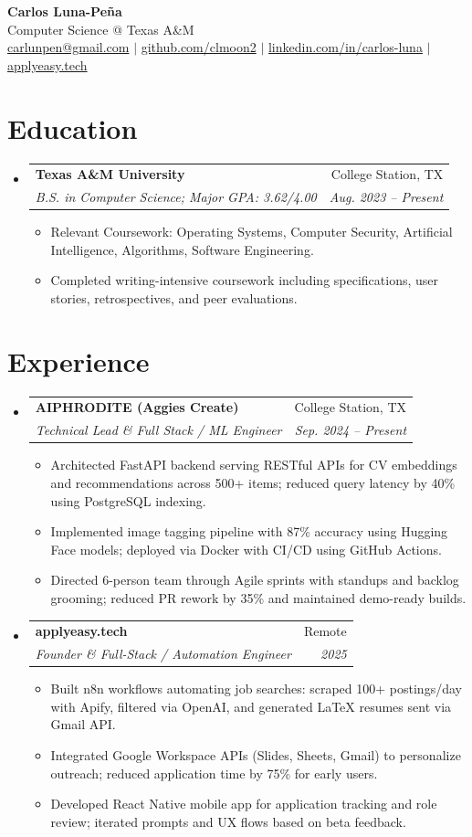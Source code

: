 \documentclass[letterpaper,11pt]{article}
\makeatletter
\newcommand{\resumeItem}[1]{
  \item\small{{#1 \vspace{-2pt}}}
}
\newcommand{\resumeSubheading}[4]{
  \vspace{-2pt}\item
    \begin{tabular*}{0.97\textwidth}[t]{l@{\extracolsep{\fill}}r}
      \textbf{#1} & #2 \\
      \textit{\small#3} & \textit{\small #4} \\
    \end{tabular*}\vspace{-7pt}
}
\newcommand{\resumeSubHeadingListStart}{\begin{itemize}[leftmargin=0.15in, label={}]}
\newcommand{\resumeSubHeadingListEnd}{\end{itemize}}
\newcommand{\resumeItemListStart}{\begin{itemize}}
\newcommand{\resumeItemListEnd}{\end{itemize}\vspace{-5pt}}
\makeatother
\begin{document}
\begin{center}
  {\LARGE \textbf{Carlos Luna-Pe\~na}}\\
  Computer Science @ Texas A\&M \\
  \href{mailto:carlunpen@gmail.com}{carlunpen@gmail.com} $|$
  \href{https://github.com/clmoon2}{github.com/clmoon2} $|$
  \href{https://www.linkedin.com/in/carlos-luna}{linkedin.com/in/carlos-luna} $|$
  \href{https://applyeasy.tech}{applyeasy.tech}
\end{center}

\section{Education}
\resumeSubHeadingListStart
  \resumeSubheading
    {Texas A\&M University}{College Station, TX}
    {B.S. in Computer Science; Major GPA: 3.62/4.00}{Aug. 2023 -- Present}
    \resumeItemListStart
      \resumeItem{Relevant Coursework: Operating Systems, Computer Security, Artificial Intelligence, Algorithms, Software Engineering.}
      \resumeItem{Completed writing-intensive coursework including specifications, user stories, retrospectives, and peer evaluations.}
    \resumeItemListEnd
\resumeSubHeadingListEnd

\section{Experience}
\resumeSubHeadingListStart
  \resumeSubheading
    {AIPHRODITE (Aggies Create)}{College Station, TX}
    {Technical Lead \& Full Stack / ML Engineer}{Sep. 2024 -- Present}
    \resumeItemListStart
      \resumeItem{Architected FastAPI backend serving RESTful APIs for CV embeddings and recommendations across 500+ items; reduced query latency by 40\% using PostgreSQL indexing.}
      \resumeItem{Implemented image tagging pipeline with 87\% accuracy using Hugging Face models; deployed via Docker with CI/CD using GitHub Actions.}
      \resumeItem{Directed 6-person team through Agile sprints with standups and backlog grooming; reduced PR rework by 35\% and maintained demo-ready builds.}
    \resumeItemListEnd

  \resumeSubheading
    {applyeasy.tech}{Remote}
    {Founder \& Full-Stack / Automation Engineer}{2025}
    \resumeItemListStart
      \resumeItem{Built n8n workflows automating job searches: scraped 100+ postings/day with Apify, filtered via OpenAI, and generated LaTeX resumes sent via Gmail API.}
      \resumeItem{Integrated Google Workspace APIs (Slides, Sheets, Gmail) to personalize outreach; reduced application time by 75\% for early users.}
      \resumeItem{Developed React Native mobile app for application tracking and role review; iterated prompts and UX flows based on beta feedback.}
    \resumeItemListEnd
\resumeSubHeadingListEnd
\end{document}
